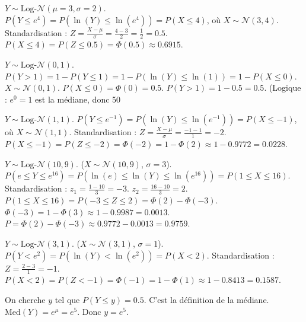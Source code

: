 \begin{correctionbox}
$Y \sim \text{Log-}\mathcal{N}(\mu=3, \sigma=2)$.
$P(Y \le e^4) = P(\ln(Y) \le \ln(e^4)) = P(X \le 4)$, où $X \sim \mathcal{N}(3, 4)$.
Standardisation : $Z = \frac{X - \mu}{\sigma} = \frac{4 - 3}{2} = \frac{1}{2} = 0.5$.
$P(X \le 4) = P(Z \le 0.5) = \Phi(0.5) \approx 0.6915$.
\end{correctionbox}

\begin{correctionbox}
$Y \sim \text{Log-}\mathcal{N}(0, 1)$.
$P(Y > 1) = 1 - P(Y \le 1) = 1 - P(\ln(Y) \le \ln(1)) = 1 - P(X \le 0)$.
$X \sim \mathcal{N}(0, 1)$. $P(X \le 0) = \Phi(0) = 0.5$.
$P(Y > 1) = 1 - 0.5 = 0.5$. (Logique : $e^0=1$ est la médiane, donc 50%
\end{correctionbox}

\begin{correctionbox}
$Y \sim \text{Log-}\mathcal{N}(1, 1)$.
$P(Y \le e^{-1}) = P(\ln(Y) \le \ln(e^{-1})) = P(X \le -1)$, où $X \sim \mathcal{N}(1, 1)$.
Standardisation : $Z = \frac{X - \mu}{\sigma} = \frac{-1 - 1}{1} = -2$.
$P(X \le -1) = P(Z \le -2) = \Phi(-2) = 1 - \Phi(2) \approx 1 - 0.9772 = 0.0228$.
\end{correctionbox}

\begin{correctionbox}
$Y \sim \text{Log-}\mathcal{N}(10, 9)$. ($X \sim \mathcal{N}(10, 9)$, $\sigma=3$).
$P(e \le Y \le e^{16}) = P(\ln(e) \le \ln(Y) \le \ln(e^{16})) = P(1 \le X \le 16)$.
Standardisation :
$z_1 = \frac{1 - 10}{3} = -3$.
$z_2 = \frac{16 - 10}{3} = 2$.
$P(1 \le X \le 16) = P(-3 \le Z \le 2) = \Phi(2) - \Phi(-3)$.
$\Phi(-3) = 1 - \Phi(3) \approx 1 - 0.9987 = 0.0013$.
$P = \Phi(2) - \Phi(-3) \approx 0.9772 - 0.0013 = 0.9759$.
\end{correctionbox}

\begin{correctionbox}
$Y \sim \text{Log-}\mathcal{N}(3, 1)$. ($X \sim \mathcal{N}(3, 1)$, $\sigma=1$).
$P(Y < e^2) = P(\ln(Y) < \ln(e^2)) = P(X < 2)$.
Standardisation : $Z = \frac{2 - 3}{1} = -1$.
$P(X < 2) = P(Z < -1) = \Phi(-1) = 1 - \Phi(1) \approx 1 - 0.8413 = 0.1587$.
\end{correctionbox}

\begin{correctionbox}
On cherche $y$ tel que $P(Y \le y) = 0.5$.
C'est la définition de la médiane. $\text{Med}(Y) = e^{\mu} = e^5$.
Donc $y = e^5$.
\end{correctionbox}

